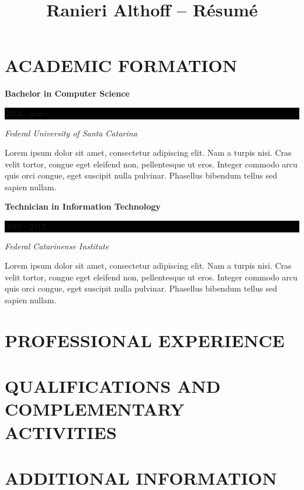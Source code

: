 \documentclass[10pt]{article}
\newcommand{\sectiontitle}[1]{\section*{\uppercase{#1}}}
\begin{document}
 \selectfont

\title{Ranieri Althoff -- Résumé}

\sectiontitle{Academic Formation}
\textbf{Bachelor in Computer Science} \hfill
\colorbox{black}{
	\parbox{8em}{
		\hfill \color{white} 2013 - now
	}
} \par
\textit{Federal University of Santa Catarina} \par
\small Lorem ipsum dolor sit amet, consectetur adipiscing elit. Nam a turpis
	nisi. Cras velit tortor, congue eget eleifend non, pellentesque ut eros.
	Integer commodo arcu quis orci congue, eget suscipit nulla pulvinar.
	Phasellus bibendum tellus sed sapien nullam. \par
\normalsize
\vspace{1em}

\textbf{Technician in Information Technology} \hfill
\colorbox{black}{
	\parbox{8em}{
		\hfill \color{white} 2010 - 2012
	}
} \par
\textit{Federal Catarinense Institute} \par
\small Lorem ipsum dolor sit amet, consectetur adipiscing elit. Nam a turpis
	nisi. Cras velit tortor, congue eget eleifend non, pellentesque ut eros.
	Integer commodo arcu quis orci congue, eget suscipit nulla pulvinar.
	Phasellus bibendum tellus sed sapien nullam. \par
\normalsize
\vspace{1em}


\sectiontitle{Professional Experience}


\sectiontitle{Qualifications and Complementary Activities}


\sectiontitle{Additional Information}
\end{document}
